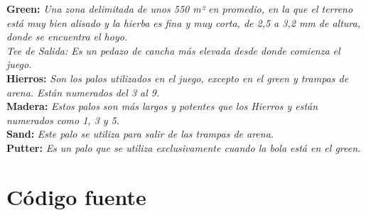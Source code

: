 \documentclass[runningheads,a4paper]{llncs}
\begin{document}
  \textbf{Green:}  \textit{Una zona delimitada de unos 550 m² en promedio, en la
    que el terreno está muy bien alisado y la hierba es fina y muy corta, de 2,5
    a 3,2 mm de altura, donde se encuentra el hoyo.\\ 
  Tee de Salida: Es un pedazo de cancha más elevada desde donde comienza el
  juego.}\\
  
  \textbf{Hierros:} \textit{Son los palos utilizados en el juego, excepto en el
  green y trampas de arena. Están numerados del 3 al 9.}\\
  
  \textbf{Madera:} \textit{Estos palos son más largos y potentes que los Hierros
  y están numerados como 1, 3 y 5.}\\
  
  \textbf{Sand:} \textit{Este palo se utiliza para salir de las trampas de
  arena.}\\
  
  \textbf{Putter:} \textit{Es un palo que se utiliza exclusivamente cuando la
  bola está en el green.}

\clearpage

\section{Código fuente}\label{sec:source}

\clearpage

\inputminted[linenos, numbersep=2pt, tabsize=2, frame=lines, label=core.clj]{clojure}{../golf-proximo-tiro/src/golf_proximo_tiro/core.clj}
\inputminted[linenos, numbersep=2pt, tabsize=2, frame=lines, label=core.clj]{clojure}{../golf-proximo-tiro/src/golf_proximo_tiro/main.clj}
\end{document}
